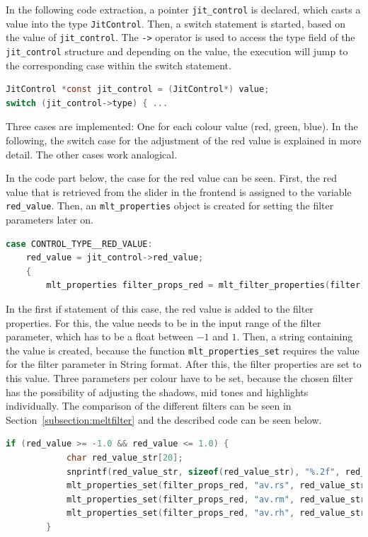 \documentclass[../MasterThesis.tex]{subfiles}
\begin{document}
In the following code extraction, a pointer \texttt{jit\_control} is declared, which casts a value into the type \texttt{JitControl}.
Then, a switch statement is started, based on the value of \texttt{jit\_control}.
The \texttt{->} operator is used to access the type field of the \texttt{jit\_control} structure and depending on the value, the execution will jump to the corresponding case within the switch statement.

\begin{lstlisting}[language=c, numbers=none, columns=fullflexible]		
JitControl *const jit_control = (JitControl*) value;
switch (jit_control->type) { ...
\end{lstlisting}

Three cases are implemented: One for each colour value (red, green, blue). In the following, the switch case for the adjustment of the red value is explained in more detail. The other cases work analogical.

In the code part below, the case for the red value can be seen. First, the red value that is retrieved from the slider in the frontend is assigned to the variable \texttt{red\_value}. Then, an \texttt{mlt\_properties} object is created for setting the filter parameters later on. 

\begin{lstlisting}[language=c, numbers=none, columns=fullflexible]			
case CONTROL_TYPE__RED_VALUE:
	red_value = jit_control->red_value;
	{
		mlt_properties filter_props_red = mlt_filter_properties(filter);
\end{lstlisting}

In the first if statement of this case, the red value is added to the filter properties. For this, the value needs to be in the input range of the filter parameter, which has to be a float between $-1$ and $1$. Then, a string containing the value is created, because the function \texttt{mlt\_properties\_set} requires the value for the filter parameter in String format. After this, the filter properties are set to this value. Three parameters per colour have to be set, because the chosen filter has the possibility of adjusting the shadows, mid tones and highlights individually. 
The comparison of the different filters can be seen in Section~\ref{subsection:meltfilter} and the described code can be seen below.


\begin{lstlisting}[language=c, numbers=none, columns=fullflexible]
		if (red_value >= -1.0 && red_value <= 1.0) {
			char red_value_str[20]; 
			snprintf(red_value_str, sizeof(red_value_str), "%.2f", red_value);
			mlt_properties_set(filter_props_red, "av.rs", red_value_str);
			mlt_properties_set(filter_props_red, "av.rm", red_value_str);
			mlt_properties_set(filter_props_red, "av.rh", red_value_str);
		}	
\end{lstlisting}
\end{document}
